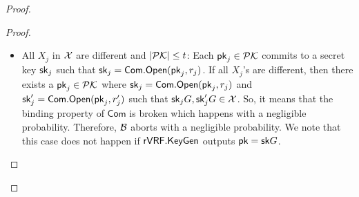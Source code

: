 \begin{proof}
\begin{proof}
			\begin{itemize}
				
			\item All $ X_j $ in $ {\mathcal{X}} $ are different  and $ |{\mathcal{PK}}| \leq t $: Each $ \mathsf{pk}_j \in {\ensuremath{\mathcal{PK}}} $ commits to a secret key $ \mathsf{sk}_j $ such that $ \mathsf{sk}_j = \mathsf{Com}.\mathsf{Open}(\mathsf{pk}_j, r_j) $. If all $ X_j $'s are different, then there exists a $ \mathsf{pk}_j \in {\ensuremath{\mathcal{PK}}} $ where $ \mathsf{sk}_j = \mathsf{Com}.\mathsf{Open}(\mathsf{pk}_j, r_j) $ and $ \mathsf{sk}'_j = \mathsf{Com}.\mathsf{Open}(\mathsf{pk}_j, r'_j) $ such that $ \mathsf{sk}_j G, \mathsf{sk}_j'G \in {\ensuremath{\mathcal{X}}} $. So, it  means that the binding property of $ \mathsf{Com} $ is broken which happens with a negligible probability. Therefore, $ \mathcal{B}  $ aborts with a negligible probability. We note that this case does not happen if $ {\mathsf{rVRF}}.{\mathsf{KeyGen}} $  outputs $ \mathsf{pk} = \mathsf{sk} G $. 
			

\end{itemize}
\end{proof}
\end{proof}
